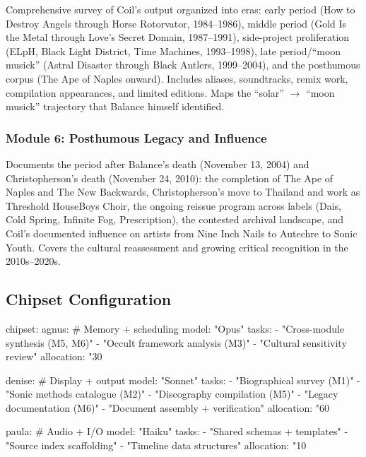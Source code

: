 \documentclass[11pt,letterpaper]{article}
\begin{document}
Comprehensive survey of Coil's output organized into eras: early period (How to Destroy Angels through Horse Rotorvator, 1984--1986), middle period (Gold Is the Metal through Love's Secret Domain, 1987--1991), side-project proliferation (ELpH, Black Light District, Time Machines, 1993--1998), late period/``moon musick'' (Astral Disaster through Black Antlers, 1999--2004), and the posthumous corpus (The Ape of Naples onward). Includes aliases, soundtracks, remix work, compilation appearances, and limited editions. Maps the ``solar'' $\rightarrow$ ``moon musick'' trajectory that Balance himself identified.

\subsubsection{Module 6: Posthumous Legacy and Influence}

Documents the period after Balance's death (November 13, 2004) and Christopherson's death (November 24, 2010): the completion of The Ape of Naples and The New Backwards, Christopherson's move to Thailand and work as Threshold HouseBoys Choir, the ongoing reissue program across labels (Dais, Cold Spring, Infinite Fog, Prescription), the contested archival landscape, and Coil's documented influence on artists from Nine Inch Nails to Autechre to Sonic Youth. Covers the cultural reassessment and growing critical recognition in the 2010s--2020s.

\subsection{Chipset Configuration}

\begin{asciibox}
chipset:
  agnus:                    # Memory + scheduling
    model: "Opus"
    tasks:
      - "Cross-module synthesis (M5, M6)"
      - "Occult framework analysis (M3)"
      - "Cultural sensitivity review"
    allocation: "30%

  denise:                   # Display + output
    model: "Sonnet"
    tasks:
      - "Biographical survey (M1)"
      - "Sonic methods catalogue (M2)"
      - "Discography compilation (M5)"
      - "Legacy documentation (M6)"
      - "Document assembly + verification"
    allocation: "60%

  paula:                    # Audio + I/O
    model: "Haiku"
    tasks:
      - "Shared schemas + templates"
      - "Source index scaffolding"
      - "Timeline data structures"
    allocation: "10%
\end{asciibox}
\end{document}
